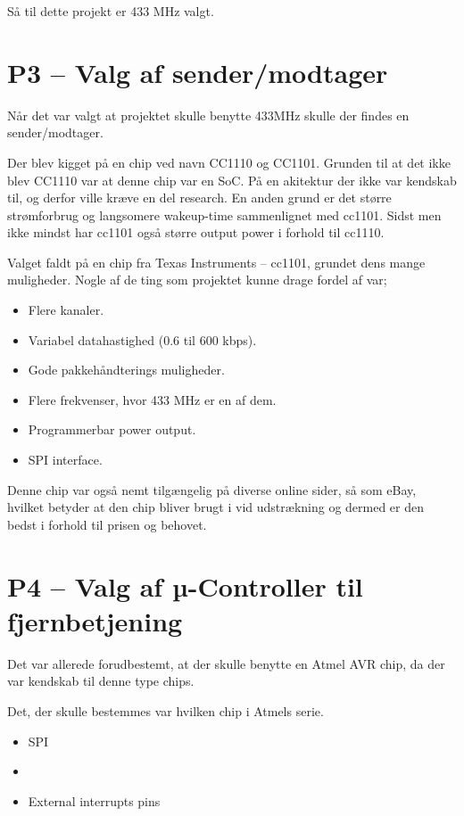 \documentclass[Main]{subfiles}
\begin{document}
Så til dette projekt er 433 MHz valgt.




\section[Valg af sender/modtager]{P3 -- Valg af sender/modtager}

Når det var valgt at projektet skulle benytte 433MHz skulle der findes en sender/modtager.

Der blev kigget på en chip ved navn CC1110 og CC1101. Grunden til at det ikke blev CC1110 var at denne chip var en SoC. På en akitektur der ikke var kendskab til, og derfor ville kræve en del research.
En anden grund er det større strømforbrug og langsomere wakeup-time sammenlignet med cc1101. Sidst men ikke mindst har cc1101 også større output power i forhold til cc1110.

Valget faldt på en chip fra Texas Instruments -- cc1101\cite{TI-cc1101}, grundet dens mange muligheder.
Nogle af de ting som projektet kunne drage fordel af var;

\begin{itemize}
\item Flere kanaler.
\item Variabel datahastighed (0.6 til 600 kbps).
\item Gode pakkehåndterings muligheder. 
\item Flere frekvenser, hvor 433 MHz er en af dem.
\item Programmerbar power output.
\item SPI interface.
\end{itemize}

Denne chip var også nemt tilgængelig på diverse online sider, så som eBay\cite{eBay}, hvilket betyder at den chip bliver brugt i vid udstrækning og dermed er den bedst i forhold til prisen og behovet.




\section[Valg af µ-Controller til fjernbetjening]{P4 -- Valg af µ-Controller til fjernbetjening}

Det var allerede forudbestemt, at der skulle benytte en Atmel AVR chip, da der var kendskab til denne type chips.

Det, der skulle bestemmes var hvilken chip i Atmels serie.

\begin{itemize}
\item SPI
\item \itoc
\item External interrupts pins
\end{itemize}
\end{document}
